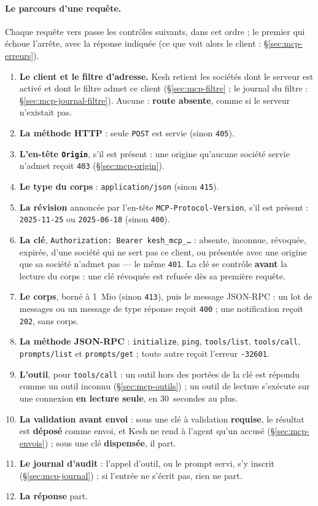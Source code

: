 \documentclass[a4paper,11pt,oneside]{article}
\begin{document}
\paragraph{Le parcours d'une requête.} Chaque requête vers  passe les contrôles suivants, dans cet ordre ; le premier qui échoue l'arrête, avec la réponse indiquée (ce que voit alors le client : \S\ref{sec:mcp-erreurs}).
\begin{enumerate}
    \item \textbf{Le client et le filtre d'adresse.} Kesh retient les sociétés dont le serveur est activé et dont le filtre admet ce client (\S\ref{sec:mcp-filtre} ; le journal du filtre : \S\ref{sec:mcp-journal-filtre}). Aucune : \textbf{route absente}, comme si le serveur n'existait pas.
    \item \textbf{La méthode HTTP} : seule \texttt{POST} est servie (sinon \texttt{405}).
    \item \textbf{L'en-tête \texttt{Origin}}, s'il est présent : une origine qu'aucune société servie n'admet reçoit \texttt{403} (\S\ref{sec:mcp-origin}).
    \item \textbf{Le type du corps} : \texttt{application/json} (sinon \texttt{415}).
    \item \textbf{La révision} annoncée par l'en-tête \texttt{MCP-Protocol-Version}, s'il est présent : \texttt{2025-11-25} ou \texttt{2025-06-18} (sinon \texttt{400}).
    \item \textbf{La clé}, \texttt{Authorization: Bearer kesh\_mcp\_\ldots} : absente, inconnue, révoquée, expirée, d'une société qui ne sert pas ce client, ou présentée avec une origine que sa société n'admet pas --- le même \texttt{401}. La clé se contrôle \textbf{avant} la lecture du corps : une clé révoquée est refusée dès sa première requête.
    \item \textbf{Le corps}, borné à 1~Mio (sinon \texttt{413}), puis le message JSON-RPC : un lot de messages ou un message de type réponse reçoit \texttt{400} ; une notification reçoit \texttt{202}, sans corps.
    \item \textbf{La méthode JSON-RPC} : \texttt{initialize}, \texttt{ping}, \texttt{tools/list}, \texttt{tools/call}, \texttt{prompts/list} et \texttt{prompts/get} ; toute autre reçoit l'erreur \texttt{-32601}.
    \item \textbf{L'outil}, pour \texttt{tools/call} : un outil hors des portées de la clé est répondu comme un outil inconnu (\S\ref{sec:mcp-outils}) ; un outil de lecture s'exécute sur une connexion \textbf{en lecture seule}, en 30~secondes au plus.
    \item \textbf{La validation avant envoi} : sous une clé à validation \textbf{requise}, le résultat est \textbf{déposé} comme envoi, et Kesh ne rend à l'agent qu'un accusé (\S\ref{sec:mcp-envois}) ; sous une clé \textbf{dispensée}, il part.
    \item \textbf{Le journal d'audit} : l'appel d'outil, ou le prompt servi, s'y inscrit (\S\ref{sec:mcp-journal}) ; si l'entrée ne s'écrit pas, rien ne part.
    \item \textbf{La réponse} part.
\end{enumerate}
\end{document}
